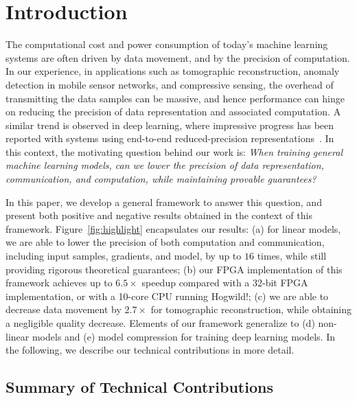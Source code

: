 \documentclass{article}
\begin{document}
\section{Introduction}

The computational cost and power consumption of today's machine learning systems are often driven by data movement, and by the precision of computation. 
In our experience, in applications such as tomographic reconstruction, anomaly detection in mobile sensor networks,
and compressive sensing, the overhead of transmitting the data samples can be massive, 
and hence performance can hinge on reducing the precision of data representation and 
associated computation. 
A similar trend is observed in deep learning, where impressive progress has been reported with systems 
using end-to-end reduced-precision representations~\cite{hubara2016quantized,
rastegari2016xnor,zhou2016dorefa,miyashita2016convolutional}. 
In this context, the motivating question behind our work is:  {\em When training general machine learning models,
can we lower the precision of data representation,
communication, and computation, while maintaining provable guarantees?}
 
In this paper, we develop a general 
framework to answer this question, and
present both positive and negative results
 obtained in the context of this framework. 
 Figure~\ref{fig:highlight} encapsulates our results: 
(a) for linear models, we are able to lower the precision of both computation and communication, including input samples, gradients, and model, by up to $16$ times, while still providing rigorous theoretical guarantees; 
(b) our FPGA implementation of this framework achieves up to $6.5\times$ speedup compared with
a 32-bit FPGA implementation, or with a 10-core CPU running Hogwild!;  
(c) we are able to decrease data movement by $2.7\times$ for
tomographic reconstruction, while obtaining a negligible quality decrease. 
Elements of our framework generalize to (d) non-linear models and (e) model compression for training deep learning models. 
In the following, we describe our technical contributions in more detail. 


\subsection{Summary of Technical Contributions}
\end{document}
